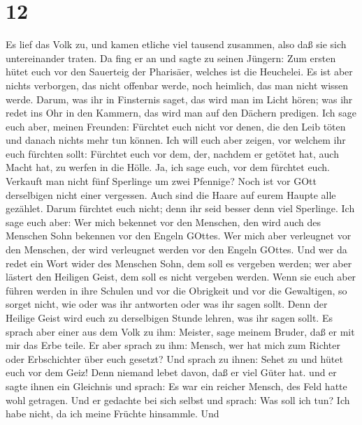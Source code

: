 \hypertarget{section-11}{%
\section{12}\label{section-11}}

 Es lief das Volk zu, und kamen etliche viel tausend
zusammen, also daß sie sich untereinander traten. Da fing er an und
sagte zu seinen Jüngern: Zum ersten hütet euch vor den Sauerteig der
Pharisäer, welches ist die Heuchelei.  Es ist aber nichts
verborgen, das nicht offenbar werde, noch heimlich, das man nicht wissen
werde.  Darum, was ihr in Finsternis saget, das wird man im
Licht hören; was ihr redet ins Ohr in den Kammern, das wird man auf den
Dächern predigen.  Ich sage euch aber, meinen Freunden:
Fürchtet euch nicht vor denen, die den Leib töten und danach nichts mehr
tun können.  Ich will euch aber zeigen, vor welchem ihr euch
fürchten sollt: Fürchtet euch vor dem, der, nachdem er getötet hat, auch
Macht hat, zu werfen in die Hölle. Ja, ich sage euch, vor dem fürchtet
euch.  Verkauft man nicht fünf Sperlinge um zwei Pfennige?
Noch ist vor GOtt derselbigen nicht einer vergessen.  Auch
sind die Haare auf eurem Haupte alle gezählet. Darum fürchtet euch
nicht; denn ihr seid besser denn viel Sperlinge.  Ich sage
euch aber: Wer mich bekennet vor den Menschen, den wird auch des
Menschen Sohn bekennen vor den Engeln GOttes.  Wer mich aber
verleugnet vor den Menschen, der wird verleugnet werden vor den Engeln
GOttes.  Und wer da redet ein Wort wider des Menschen Sohn,
dem soll es vergeben werden; wer aber lästert den Heiligen Geist, dem
soll es nicht vergeben werden.  Wenn sie euch aber führen
werden in ihre Schulen und vor die Obrigkeit und vor die Gewaltigen, so
sorget nicht, wie oder was ihr antworten oder was ihr sagen sollt.
 Denn der Heilige Geist wird euch zu derselbigen Stunde
lehren, was ihr sagen sollt.  Es sprach aber einer aus dem
Volk zu ihm: Meister, sage meinem Bruder, daß er mit mir das Erbe teile.
 Er aber sprach zu ihm: Mensch, wer hat mich zum Richter
oder Erbschichter über euch gesetzt?  Und sprach zu ihnen:
Sehet zu und hütet euch vor dem Geiz! Denn niemand lebet davon, daß er
viel Güter hat.  und er sagte ihnen ein Gleichnis und
sprach: Es war ein reicher Mensch, des Feld hatte wohl getragen.
 Und er gedachte bei sich selbst und sprach: Was soll ich
tun? Ich habe nicht, da ich meine Früchte hinsammle.  Und

